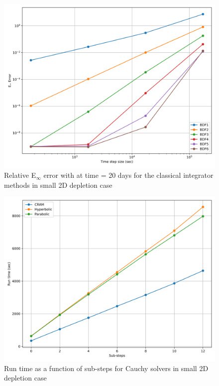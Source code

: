 \clearpage

\begin{figure}[p]
    \centering
    \includegraphics[width=5in]{images/chapter-5/caseStudies/small2DDepletion/msrSmall2DDepletionEinfErrorerrorIntegrators.png}
    \caption{Relative E$_{\infty}$ error with at time = 20 days for the classical integrator methods in small 2D depletion case}
    \label{fig:small_2D_depletion_Einf_integrators}
\end{figure}

\clearpage

\begin{figure}[p]
    \centering
    \includegraphics[width=5in]{images/chapter-5/caseStudies/small2DDepletion/msr2DDepletionSmallCauchyRuntimes.png}
    \caption{Run time as a function of sub-steps for Cauchy solvers in small 2D depletion case}
    \label{fig:small_2D_depletion_Cauchy_runtimes}
\end{figure}

